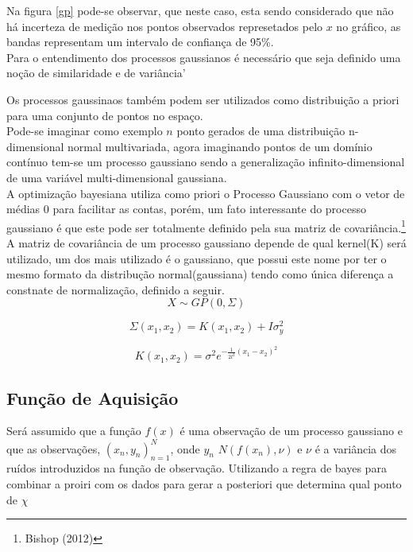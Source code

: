 \documentclass[
	12pt,				%
	a4paper,		%
	oneside,    %
	chapter=TITLE,		   %
	section=TITLE,		   %
	subsection=TITLE,	   %
	subsubsection=TITLE, %
	english,			%
	french,				%
	spanish,			%
	brazil,				%
]{abntex2}
\begin{document}
Na figura \ref{gp} pode-se observar, que neste caso, esta sendo
considerado que não há incerteza de medição nos pontos observados
represetados pelo \(x\) no gráfico, as bandas representam um intervalo
de confiança de 95\%.\\

Para o entendimento dos processos gaussianos é necessário que seja
definido uma noção de similaridade e de variância'

Os processos gaussinaos também podem ser utilizados como distribuição a
priori para uma conjunto de pontos no espaço.\\

Pode-se imaginar como exemplo \(n\) ponto gerados de uma distribuição
n-dimensional normal multivariada, agora imaginando pontos de um domínio
contínuo tem-se um processo gaussiano sendo a generalização
infinito-dimensional de uma variável multi-dimensional gaussiana.\\

A optimização bayesiana utiliza como priori o Processo Gaussiano com o
vetor de médias 0 para facilitar as contas, porém, um fato interessante
do processo gaussiano é que este pode ser totalmente definido pela sua
matriz de covariância.\footnote{Bishop (2012)}\\

A matriz de covariância de um processo gaussiano depende de qual
kernel(K) será utilizado, um dos mais utilizado é o gaussiano, que
possui este nome por ter o mesmo formato da distribução
normal(gaussiana) tendo como única diferença a constnate de
normalização, definido a seguir.\\

\[
X \sim GP(0,\Sigma)
\]

\[
\Sigma(x_1,x_2) = K(x_1,x_2) + I\sigma^2_y
\]

\[
K(x_1,x_2) = \sigma^2 e^{-\frac{1}{2l^2}(x_1-x_2)^2}
\]

\hypertarget{funuxe7uxe3o-de-aquisiuxe7uxe3o}{%
\subsection{Função de Aquisição}\label{funuxe7uxe3o-de-aquisiuxe7uxe3o}}

Será assumido que a função \(f(x)\) é uma observação de um processo
gaussiano e que as observações, \((x_n,y_n)_{n=1}^N\), onde
\(y_n \mbox{~} N(f(x_n),\nu)\) e \(\nu\) é a variância dos ruídos
introduzidos na função de observação. Utilizando a regra de bayes para
combinar a proiri com os dados para gerar a posteriori que determina
qual ponto de \(\chi\)
\end{document}
